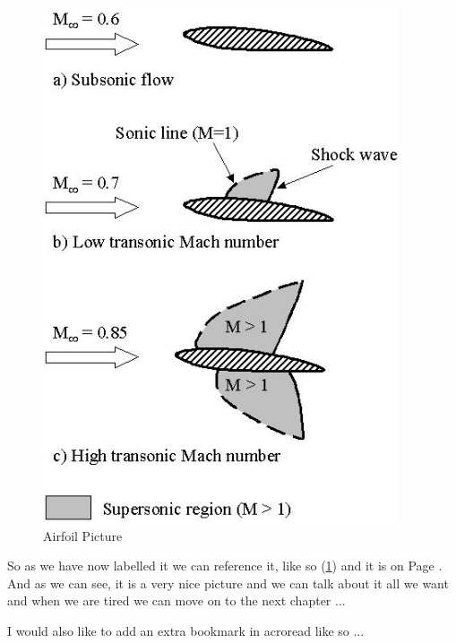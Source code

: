 \begin{figure}[!htbp]
  \begin{center}
    \leavevmode
    \ifpdf
      \includegraphics[height=6in]{aflow}
    \fi
    \caption{Airfoil Picture}
    \label{FigAir}
  \end{center}
\end{figure}

So as we have now labelled it we can reference it, like so (\ref{FigAir}) and it
is on Page \pageref{FigAir}. And as we can see, it is a very nice picture and we
can talk about it all we want and when we are tired we can move on to the next
chapter ...

I would also like to add an extra bookmark in acroread like so ...
\ifpdf
\fi

